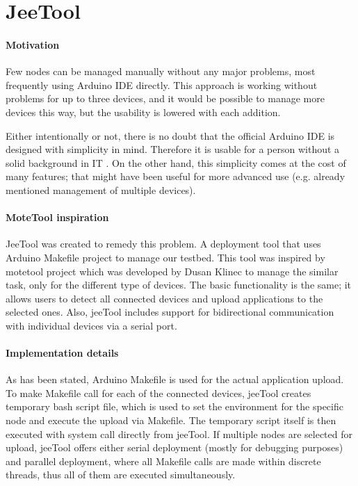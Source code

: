 \documentclass[
  print, %
  Table,   %
  nolof,     %
  nolot,     %
           oneside
]{fithesis3}
\begin{document}
\section{JeeTool}\label{sec:jeetool}


\paragraph{Motivation}
  Few nodes can be managed manually without any major problems, most frequently using  Arduino IDE \cite{Arduino} directly. This approach is working without problems for up to three devices, and it would be possible to manage more devices this way, but the usability is lowered with each addition.

  Either intentionally or not, there is no doubt that the official Arduino IDE is designed with simplicity in mind. Therefore it is usable for a person without a solid background in IT \cite{ArduinoIntro}. On the other hand, this simplicity comes at the cost of many features; that might have been useful for more advanced use (e.g. already mentioned management of multiple devices).

\paragraph{MoteTool inspiration}
  JeeTool \cite{JeeTool} was created to remedy this problem. A deployment tool that uses Arduino Makefile project \cite{ArduinoMK} to manage our testbed. This tool was inspired by motetool project \cite{motetool} which was developed by Dusan Klinec to manage the similar task, only for the different type of devices. The basic functionality is the same; it allows users to detect all connected devices and upload applications to the selected ones. Also, jeeTool includes support for bidirectional communication with individual devices via a serial port.

\paragraph{Implementation details}
  As has been stated, Arduino Makefile is used for the actual application upload. To make Makefile call for each of the connected devices, jeeTool creates temporary bash script file, which is used to set the environment for the specific node and execute the upload via Makefile. The temporary script itself is then executed with system call directly from jeeTool. If multiple nodes are selected for upload, jeeTool offers either serial deployment (mostly for debugging purposes) and parallel deployment, where all Makefile calls are made within discrete threads, thus all of them are executed simultaneously.
\end{document}
